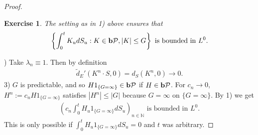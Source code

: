 \documentclass[12pt,a4paper, twoside]{article}
\newtheorem{exe}{Exercise}[section]
\theoremstyle{definition}
\newcommand{\pred}{\textbf{\text{b}}\mathcal{P}}
\begin{document}
\begin{proof}
\begin{exe} \label{ex12} The setting as in 1) above ensures that 
\begin{align*}
\left\{ \int_0^t K_u dS_u : K \in \pred , |K | \leq G \right\} \text{ is bounded in } L^0.
\end{align*}
\end{exe}
) Take $\lambda_n \equiv 1$. Then by definition 
\begin{align*}
\widetilde{d}_E'( K^n \cdot S, 0) = d_S(K^n,0) \to 0. 
\end{align*}
3) $G$ is predictable, and so $H1_{\{ G = \infty\}} \in \pred$ if $H \in \pred$. For $c_n \to 0$, $H^n:= c_n H 1_{\{ G = \infty\}}$ satisfies $|H^n| \leq |G|$ because $G= \infty$ on $\{ G= \infty\}$. By 1) we get 
\begin{align*}
\left( c_n \int_0^t H_u 1_{\{ G= \infty\}} dS_u \right)_{n \in \mathbb{N}} \text{ is bounded in } L^0.
\end{align*}
This is only possible if $\int_0^t H_u 1_{\{ G= \infty\}} dS_u =0$ and $t$ was arbitrary. 
\end{proof}
\newpage
\end{document}
